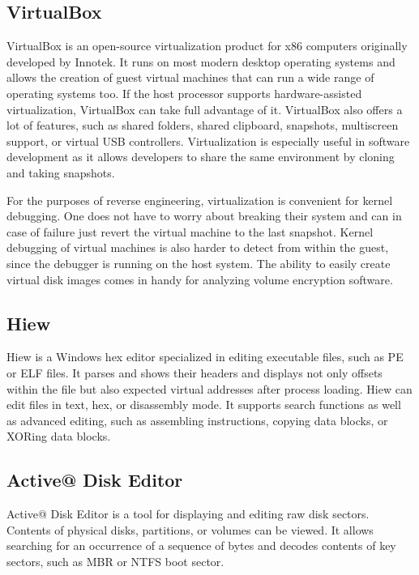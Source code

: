\documentclass[thesis=B,english]{FITthesis}[2012/10/20]
\begin{document}
	\subsection{VirtualBox}
	
	VirtualBox is an open-source virtualization product for x86 computers originally developed by Innotek. It runs on most modern desktop operating systems and allows the creation of guest virtual machines that can run a wide range of operating systems too. If the host processor supports hardware-assisted virtualization, VirtualBox can take full advantage of it. VirtualBox also offers a lot of features, such as shared folders, shared clipboard, snapshots, multiscreen support, or virtual USB controllers. Virtualization is especially useful in software development as it allows developers to share the same environment by cloning and taking snapshots.
	
	For the purposes of reverse engineering, virtualization is convenient for kernel debugging. One does not have to worry about breaking their system and can in case of failure just revert the virtual machine to the last snapshot. Kernel debugging of virtual machines is also harder to detect from within the guest, since the debugger is running on the host system. The ability to easily create virtual disk images comes in handy for analyzing volume encryption software.
	
	\subsection{Hiew}
	
	Hiew is a Windows hex editor specialized in editing executable files, such as PE or ELF files. It parses and shows their headers and displays not only offsets within the file but also expected virtual addresses after process loading. Hiew can edit files in text, hex, or disassembly mode. It supports search functions as well as advanced editing, such as assembling instructions, copying data blocks, or XORing data blocks.
	
	\subsection{Active@ Disk Editor}
	
	Active@ Disk Editor is a tool for displaying and editing raw disk sectors. Contents of physical disks, partitions, or volumes can be viewed. It allows searching for an occurrence of a sequence of bytes and decodes contents of key sectors, such as MBR or NTFS boot sector.
	
\end{document}
